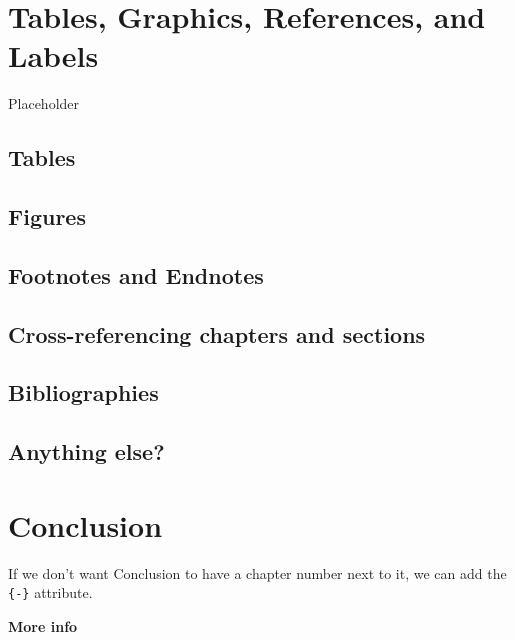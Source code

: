 \documentclass[print]{nuthesis}
\begin{document}
\hypertarget{ref-labels}{%
\chapter{Tables, Graphics, References, and Labels}\label{ref-labels}}

Placeholder

\hypertarget{tables}{%
\section{Tables}\label{tables}}

\hypertarget{figures}{%
\section{Figures}\label{figures}}

\hypertarget{footnotes-and-endnotes}{%
\section{Footnotes and Endnotes}\label{footnotes-and-endnotes}}

\hypertarget{cross-referencing-chapters-and-sections}{%
\section{Cross-referencing chapters and sections}\label{cross-referencing-chapters-and-sections}}

\hypertarget{bibliographies}{%
\section{Bibliographies}\label{bibliographies}}

\hypertarget{anything-else}{%
\section{Anything else?}\label{anything-else}}

\hypertarget{conclusion-1}{%
\chapter*{Conclusion}\label{conclusion-1}}

If we don't want Conclusion to have a chapter number next to it, we can add the \texttt{\{-\}} attribute.

\textbf{More info}
\end{document}
